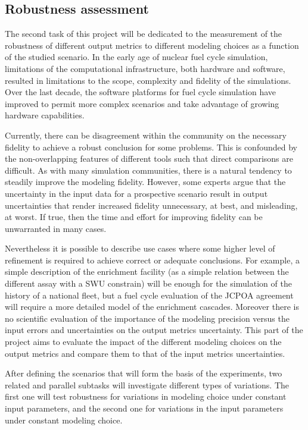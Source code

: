 
\subsection{Robustness assessment}

The second task of this project will be dedicated to the measurement of the
robustness of different output metrics to different modeling choices as a
function of the studied scenario.  In the early age of nuclear fuel cycle
simulation, limitations of the computational infrastructure, both hardware and
software, resulted in limitations to the scope, complexity and fidelity of the
simulations.  Over the last decade, the software platforms for fuel cycle
simulation have improved to permit more complex scenarios and take advantage
of growing hardware capabilities.

Currently, there can be disagreement within the community on the necessary
fidelity to achieve a robust conclusion for some problems.  This is confounded
by the non-overlapping features of different tools such that direct
comparisons are difficult. As with many simulation communities, there is a
natural tendency to steadily improve the modeling fidelity.  However, some
experts argue that the uncertainty in the input data for a prospective
scenario result in output uncertainties that render increased fidelity
unnecessary, at best, and misleading, at worst.  If true, then the time and
effort for improving fidelity can be unwarranted in many cases.

Nevertheless it is possible to describe use cases where some higher level of
refinement is required to achieve correct or adequate conclusions. For
example, a simple description of the enrichment facility (as a simple relation
between the different assay with a SWU constrain) will be enough for the
simulation of the history of a national fleet, but a fuel cycle evaluation of
the JCPOA agreement will require a more detailed model of the enrichment
cascades. Moreover there is no scientific evaluation of the importance of the
modeling precision versus the input errors and uncertainties on the output
metrics uncertainty. This part of the project aims to evaluate the impact of
the different modeling choices on the output metrics and compare them to that
of the input metrics uncertainties.

After defining the scenarios that will form the basis of the experiments, two
related and parallel subtasks will investigate different types of variations.
The first one will test robustness for variations in modeling choice under
constant input parameters, and the second one for variations in the input
parameters under constant modeling choice.

